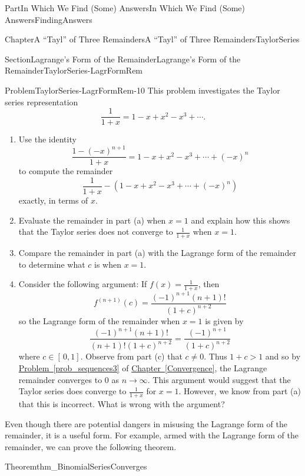 \documentclass[oneside,10pt,]{book}
\newcommand{\xreffont}{\relax}
\numberwithin{equation}{part}
\newcommand{\gt}{>}
\begin{document}
\begin{partptx}{Part}{In Which We Find (Some) Answers}{}{In Which We Find (Some) Answers}{}{}{FindingAnswers}
\begin{chapterptx}{Chapter}{A ``Tayl'' of Three Remainders}{}{A ``Tayl'' of Three Remainders}{}{}{TaylorSeries}
\begin{sectionptx}{Section}{Lagrange's Form of the Remainder}{}{Lagrange's Form of the Remainder}{}{}{TaylorSeries-LagrFormRem}
\begin{problem}{Problem}{}{TaylorSeries-LagrFormRem-10}%
This problem investigates the Taylor series representation%
\begin{equation*}
\frac{1}{1+x}=1-x+x^2-x^3+\cdots\text{.}
\end{equation*}
%
\begin{enumerate}[font=\bfseries,label=(\alph*),ref=\alph*]%
\item{}Use the identity%
\begin{equation*}
\frac{1-(-x)^{n+1}}{1+x}=1-x+x^2-x^3+\cdots+(-x)^n
\end{equation*}
to compute the remainder%
\begin{equation*}
\frac{1}{1+x}-\left(1-x+x^2-x^3+\cdots+(-x)^n\right)
\end{equation*}
exactly, in terms of \(x\).%
\item{}Evaluate the remainder in part (a) when \(x=1\) and explain how this shows that the Taylor series does not converge to \(\frac{1}{1+x}\) when \(x=1\).%
\item{}Compare the remainder in part (a) with the Lagrange form of the remainder to determine what \(c\) is when \(x=1\).%
\item{}Consider the following argument: If \(f(x)=\frac{1}{1+x}\), then%
\begin{equation*}
f^{(n+1)}(c)=\frac{(-1)^{n+1}(n+1)!}{(1+c)^{n+2}}
\end{equation*}
so the Lagrange form of the remainder when \(x=1\) is given by%
\begin{equation*}
\frac{(-1)^{n+1}(n+1)!}{(n+1)!(1+c)^{n+2}}=\frac{(-1)^{n+1}}{(1+c)^{n+2}}
\end{equation*}
where \(c\in[\,0,1]\).  Observe from part (c) that \(c\neq 0\).  Thus \(1+c\gt1\) and so by \hyperref[prob_sequences3]{Problem~{\xreffont\ref{prob_sequences3}}} of \hyperref[Convergence]{Chapter~{\xreffont\ref{Convergence}}}, the Lagrange remainder converges to \(0\) as \(n\rightarrow\infty\).  This argument would suggest that the Taylor series does converge to \(\frac{1}{1+x}\) for \(x=1\).  However, we know from part (a) that this is incorrect.  What is wrong with the argument?%
\end{enumerate}%
\end{problem}
Even though there are potential dangers in misusing the Lagrange form of the remainder, it is a useful form.  For example, armed with the Lagrange form of the remainder, we can prove the following theorem.%
\begin{theorem}{Theorem}{}{}{thm_BinomialSeriesConverges}%

\end{theorem}
\end{sectionptx}
\end{chapterptx}
\end{partptx}
\end{document}
